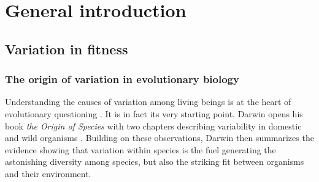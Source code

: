 
\chapter[\texorpdfstring{Chapter 1 \\ General introduction}{Chapter 1 -- General introduction}]{General introduction}
\label{chap:intro}

\section{Variation in fitness}
\subsection{The origin of variation in evolutionary biology}
Understanding the causes of variation among living beings is at the heart of evolutionary questioning \parencite{Lynch1998, Wayne2006, Kruuk2014}. It is in fact its very starting point. Darwin opens his book \emph{the Origin of Species} with two chapters describing variability in domestic and wild organisms \parencite{Darwin1859}.
Building on these observations, Darwin then summarizes the evidence showing that variation within species is the fuel generating the astonishing diversity among species, but also the striking fit between organisms and their environment.

